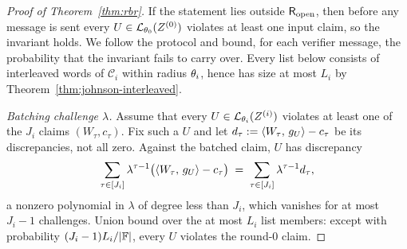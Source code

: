 \begin{proof}[Proof of Theorem~\ref{thm:rbr}]
If the statement lies outside $\mathsf{R}_{\mathrm{open}}$, then before any message is sent every $U \in \mathcal{L}_{\theta_0}(Z^{(0)})$ violates at least one input claim, so the invariant holds. We follow the protocol and bound, for each verifier message, the probability that the invariant fails to carry over. Every list below consists of interleaved words of $\mathcal{C}_i$ within radius $\theta_i$, hence has size at most $L_i$ by Theorem~\ref{thm:johnson-interleaved}.

\medskip\noindent\emph{Batching challenge $\lambda$.}
Assume that every $U \in \mathcal{L}_{\theta_i}(Z^{(i)})$ violates at least one of the $J_i$ claims $(W_\tau, c_\tau)$. Fix such a $U$ and let $d_\tau := \langle W_\tau,\, g_U \rangle - c_\tau$ be its discrepancies, not all zero. Against the batched claim, $U$ has discrepancy
\[
\sum_{\tau \in [J_i]} \lambda^{\tau - 1} \bigl( \langle W_\tau,\, g_U \rangle - c_\tau \bigr) \;=\; \sum_{\tau \in [J_i]} \lambda^{\tau - 1} d_\tau ,
\]
a nonzero polynomial in $\lambda$ of degree less than $J_i$, which vanishes for at most $J_i - 1$ challenges. Union bound over the at most $L_i$ list members: except with probability $(J_i - 1) L_i / |\mathbb{F}|$, every $U$ violates the round-$0$ claim.


\end{proof}
